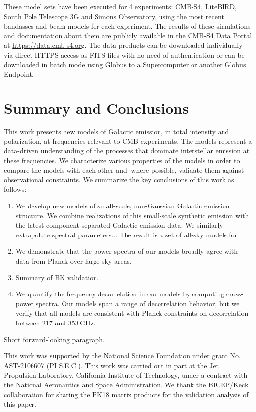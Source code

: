 \documentclass[twocolumn]{aastex631}
\begin{document}
These model sets have been executed for 4 experiments: CMB-S4, LiteBIRD, South Pole Telescope 3G and Simons Observatory, using the most recent bandasses and beam models for each experiment.
The results of these simulations and documentation about them are publicly available in the CMB-S4 Data Portal at \url{https://data.cmb-s4.org}.
The data products can be downloaded individually via direct HTTPS access as FITS files with no 
need of authentication or can be downloaded in batch mode using Globus to a Supercomputer or another
Globus Endpoint.

\section{Summary and Conclusions} \label{sec:summary}

This work presents new models of Galactic emission, in total intensity and polarization, at frequencies relevant to CMB experiments. The models represent a data-driven understanding of the processes that dominate interstellar emission at these frequencies. We characterize various properties of the models in order to compare the models with each other and, where possible, validate them against observational constraints. We summarize the key conclusions of this work as follows:

\begin{enumerate}
    \item We develop new models of small-scale, non-Gaussian Galactic emission structure. We combine realizations of this small-scale synthetic emission with the latest component-separated Galactic emission data. We similarly extrapolate spectral parameters... The result is a set of all-sky models for   
    \item We demonstrate that the power spectra of our models broadly agree with data from Planck over large sky areas. 
    \item Summary of BK validation.
    \item We quantify the frequency decorrelation in our models by computing cross-power spectra. Our models span a range of decorrelation behavior, but we verify that all models are consistent with Planck constraints on decorrelation between 217 and 353\,GHz. 
    
\end{enumerate}

Short forward-looking paragraph.

\begin{acknowledgments}

This work was supported by the National Science Foundation under grant No. AST-2106607 (PI S.E.C.). This work was carried out in part at the Jet Propulsion Laboratory, California Institute of Technology, under a contract with the National Aeronautics and Space Administration. We thank the BICEP/Keck collaboration for sharing the BK18 matrix products for the validation analysis of this paper. 

\end{acknowledgments}


\end{document}
